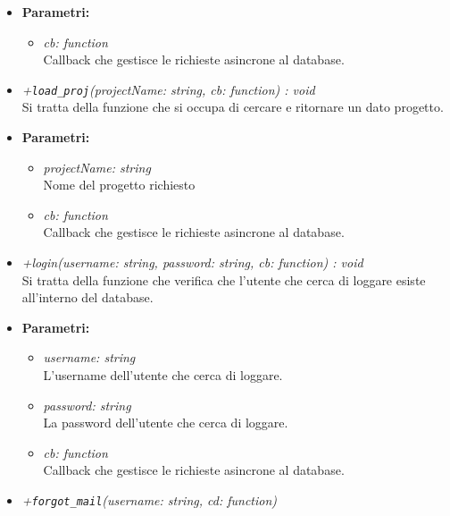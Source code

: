 \begin{itemize}
\begin{itemize}
            \item \textbf{Parametri: }\\
            \begin{itemize}
              \item \emph{cb: function}\\
              Callback che gestisce le richieste asincrone al database.
            \end{itemize}
            \item \emph{+\texttt{load\_proj}(projectName: string, cb: function) : void }\\
            Si tratta della funzione che si occupa di cercare e ritornare un dato progetto.\\
            \item \textbf{Parametri: }\\
            \begin{itemize}
              \item \emph{projectName: string}\\
              Nome del progetto richiesto
              \item \emph{cb: function}\\
              Callback che gestisce le richieste asincrone al database.
            \end{itemize}
            \item \emph{+login(username: string, password: string, cb: function) : void}\\
            Si tratta della funzione che verifica che l'utente che cerca di loggare esiste all'interno del database.\\
            \item \textbf{Parametri: }\\
            \begin{itemize}
              \item \emph{username: string}\\
              L'username dell'utente che cerca di loggare.
              \item \emph{password: string}\\
              La password dell'utente che cerca di loggare.
              \item \emph{cb: function}\\
              Callback che gestisce le richieste asincrone al database.
            \end{itemize}
            \item \emph{+\texttt{forgot\_mail}(username: string, cd: function)}\\

\end{itemize}
\end{itemize}

